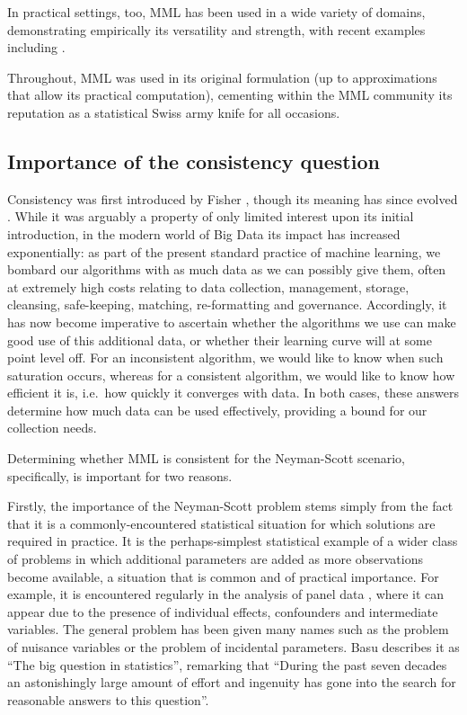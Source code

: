 \documentclass{IEEEtran}
\newcommand{\citet}[1]{\cite{#1}}
\newcommand{\citep}[1]{\cite{#1}}
\begin{document}
In practical settings, too, MML has been used in a wide variety of domains,
demonstrating empirically its versatility and strength, with recent
examples including
\citet{zamzami2018mml,li2018subspace,channoufi2018color,subramanian2017statistical,konagurthu2019information}.

Throughout, MML was used in its original formulation (up to approximations
that allow its practical computation), cementing within the MML community
its reputation as a statistical Swiss army knife for all occasions.

\subsection{Importance of the consistency question}

Consistency was first introduced by Fisher \citep{fisher1922mathematical},
though its meaning has since evolved \citep{Gerow1989}.
While it was arguably a property of only limited interest upon its initial
introduction, in the modern world of Big Data its impact has increased
exponentially: as part of the present standard practice of machine learning,
we bombard our algorithms with as much data as we can possibly give them,
often at extremely high costs relating to data collection, management,
storage, cleansing, safe-keeping, matching, re-formatting and governance.
Accordingly, it has now become
imperative to ascertain whether the algorithms we use
can make good use of this additional data, or whether their learning curve
will at some point level off. For an inconsistent algorithm, we would like
to know when such saturation occurs, whereas for a consistent algorithm, we
would like to know how efficient it is, i.e.\ how quickly it converges with
data. In both cases, these answers determine how much data can be used
effectively, providing a bound for our collection needs.

Determining whether MML is consistent for the Neyman-Scott scenario,
specifically, is important for two reasons.

Firstly,
the importance of the Neyman-Scott problem stems simply from the fact that
it is a commonly-encountered statistical situation for which solutions are
required in practice. It is the perhaps-simplest statistical example
of a wider class of problems in which additional parameters are added as
more observations become available, a situation that is common and of
practical importance. For example, it is encountered regularly in the
analysis of panel data \citep{baltagi2008econometric}, where it can appear
due to the presence of individual effects, confounders and intermediate
variables. The general problem has been given many names such as
the problem of nuisance variables or the problem of incidental parameters.
Basu \citep{basu2011elimination} describes it as ``The big
question in statistics'', remarking that ``During the past seven decades
an astonishingly large amount of effort and ingenuity has gone into the
search for reasonable answers to this question''.
\end{document}
